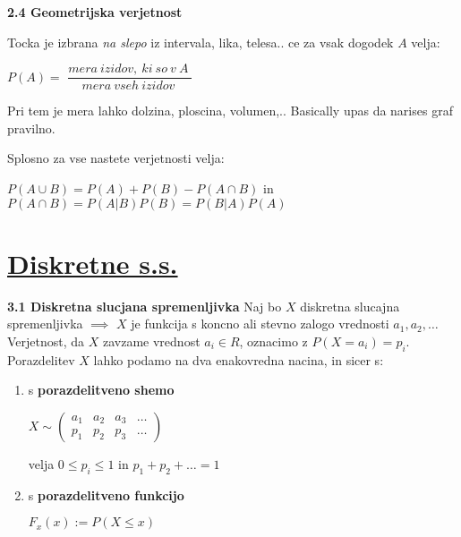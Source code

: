\documentclass{article}
\begin{document}
\begin{multicols}{2}
	\textbf{2.4 Geometrijska verjetnost}


	Tocka je izbrana \textit{na slepo} iz intervala, lika, telesa.. ce za
	vsak dogodek $A$ velja:
	\begin{center}
		\begin{math}
			P(A) =
		\end{math}
		\smallskip
		\begin{math}
			\dfrac{
				mera\: izidov,\: ki\: so\: v\: A\:
			}
			{mera\: vseh\: izidov\:}
		\end{math}
	\end{center}
	Pri tem je mera lahko dolzina, ploscina, volumen,..
	Basically upas da narises graf pravilno.

	Splosno za vse nastete verjetnosti velja:
	\begin{center}
		\begin{math}
			P(A \cup B) = P(A) + P(B) - P(A \cap B)
		\end{math} in
		\begin{math}
			P(A \cap B) = P(A | B) P(B) = P(B | A) P(A)
		\end{math}
	\end{center}

	\section{\underline{Diskretne s.s.}}

	\textbf{3.1 Diskretna slucjana spremenljivka}
	Naj bo $X$ diskretna slucajna spremenljivka $\implies$ $X$ je funkcija
	s koncno ali stevno zalogo  vrednosti ${ a_{1}, a_{2}, \dots}$ Verjetnost,
	da $X$ zavzame vrednost $a_{i} \in R$, oznacimo z $P(X = a_{i}) = p_{i}$. Porazdelitev
	$X$ lahko podamo na dva enakovredna nacina, in sicer s:
	\begin{enumerate}
		\item s \textbf{porazdelitveno shemo}
		      \begin{center}
			      \begin{math}
				      X \sim
				      \begin{pmatrix}
					      a_{1} & a_{2} & a_{3} & \dots \\
					      p_{1} & p_{2} & p_{3} & \dots
				      \end{pmatrix}
			      \end{math}
		      \end{center}
		      velja $0 \leq p_{i} \leq 1$ in $p_{1} + p_{2} + \dots = 1$
		\item s \textbf{porazdelitveno funkcijo}
		      \begin{center}
			      \begin{math}
				      F_{x}(x) := P(X \leq x)
			      \end{math}
		      \end{center}
	\end{enumerate}


\end{multicols}
\end{document}
